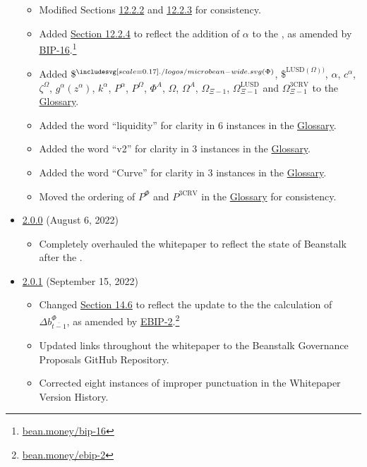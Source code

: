 \documentclass[class=article, crop=false]{standalone}
\begin{document}
\begin{itemize}[topsep=0pt, itemsep=3pt,leftmargin=16pt]
    \begin{itemize}
        \item Modified Sections \hyperlink{subsubsection.12.2.3}{12.2.2} and \hyperlink{subsubsection.12.2.3}{12.2.3} for consistency.
        \item Added \hyperlink{subsubsection.12.2.4}{Section 12.2.4} to reflect the addition of $\alpha$ to the  , as amended by \href{https://bean.money/bip-16}{BIP-16}.\footnote{\href{https://bean.money/bip-16}{bean.money/bip-16}} 
        \item Added  $\$^{\bean(\Phi)}$, $\$^{\text{LUSD}(\Omega))}$, $\alpha$, $c^{\alpha}$, $\zeta^{\Omega}$, $g^{\alpha}(z^{\alpha})$, $k^{\alpha}$, $P^{\alpha}$, $P^{\Omega}$, $\Phi^{A}$, $\Omega$, $\Omega^{A}$, $\Omega_{\Xi-1}$, $\Omega_{\Xi-1}^{\text{LUSD}}$ and $\Omega_{\Xi-1}^{\text{3CRV}}$ to the \hyperlink{subsection.14.11}{Glossary}. 
        \item Added the word ``liquidity'' for clarity in 6 instances in the \hyperlink{subsection.14.11}{Glossary}.
        \item Added the word ``v2'' for clarity in 3 instances in the \hyperlink{subsection.14.11}{Glossary}.
        \item Added the word ``Curve'' for clarity in 3 instances in the \hyperlink{subsection.14.11}{Glossary}.
        \item Moved the ordering of $P^{\Phi}$ and $P^{\text{3CRV}}$ in the \hyperlink{subsection.14.11}{Glossary} for consistency. 
    \end{itemize}  
    
    \item \href{https://github.com/BeanstalkFarms/Beanstalk-Whitepaper/blob/master/version-history/beanstalk2_0_0.pdf}{2.0.0} (August 6, 2022)
    
    \begin{itemize}
        \item Completely overhauled the whitepaper to reflect the state of Beanstalk after the .
    \end{itemize}  
    
    \item \href{https://github.com/BeanstalkFarms/Beanstalk-Whitepaper/blob/master/version-history/beanstalk2_0_1.pdf}{2.0.1} (September 15, 2022)
    
    \begin{itemize}
        \item Changed \hyperlink{subsection.14.6}{Section 14.6} to reflect the update to the the calculation of $\Delta b_{\overline{t-1}}^{\Phi}$, as amended by \href{https://bean.money/ebip-2}{EBIP-2}.\footnote{\href{https://bean.money/ebip-2}{bean.money/ebip-2}}
        \item Updated  links throughout the whitepaper to the Beanstalk Governance Proposals GitHub Repository.
        \item Corrected eight instances of improper punctuation in the Whitepaper Version History.
    \end{itemize}  
    

\end{itemize}
\end{document}
